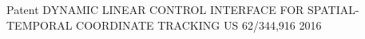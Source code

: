



\begin{cvhonors}

  \cvhonor
    {Patent} %
    {DYNAMIC LINEAR CONTROL INTERFACE FOR SPATIAL-TEMPORAL COORDINATE TRACKING} %
    {US 62/344,916} %
    {2016} %

\end{cvhonors}




\begin{cvhonors}
\end{cvhonors}

